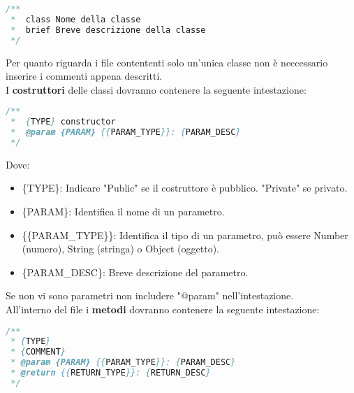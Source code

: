\begin{lstlisting}[language=Java]
/**
 *  class Nome della classe
 *  brief Breve descrizione della classe
 */
\end{lstlisting}

Per quanto riguarda i file contententi solo un'unica classe non è neccessario inserire i commenti appena descritti.
\\



I \textbf{costruttori} delle classi dovranno contenere la seguente intestazione:

\begin{lstlisting}[language=Java]
/**
 *  {TYPE} constructor
 *  @param {PARAM} {{PARAM_TYPE}}: {PARAM_DESC} 
 */
\end{lstlisting}
Dove:
\begin{itemize}
\item \{TYPE\}: Indicare "Public" se il costruttore è pubblico. "Private" se privato.
\item \{PARAM\}: Identifica il nome di un parametro.
\item \{\{PARAM\_TYPE\}\}: Identifica il tipo di un parametro, può essere Number (numero), String (stringa) o Object (oggetto).
\item \{PARAM\_DESC\}: Breve descrizione del parametro.
\end{itemize}
Se non vi sono parametri non includere "@param" nell'intestazione.
\\



All'interno del file i \textbf{metodi} dovranno contenere la seguente intestazione:

\begin{lstlisting}[language=Java]
/**
 * {TYPE}
 * {COMMENT}
 * @param {PARAM} {{PARAM_TYPE}}: {PARAM_DESC}
 * @return {{RETURN_TYPE}}: {RETURN_DESC} 
 */
\end{lstlisting}

